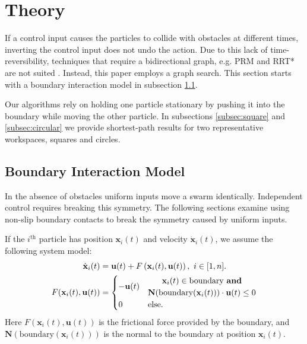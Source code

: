 \section{Theory}
\label{sec:theory}
If a control input causes the particles to collide with obstacles at different times, inverting the control input does not undo the action. Due to this lack of time-reversibility, techniques that require a bidirectional graph, e.g. PRM and RRT* are not suited \cite{lavalle2006planning,kavraki1996probabilistic}. Instead, this paper employs a graph search. This section starts with a boundary interaction model in subsection \ref{subsec:WallFriction}.

Our algorithms rely on holding one particle stationary by pushing it into the boundary while moving the other particle. In subsections \ref{subsec:square} and \ref{subsec:circular} we provide shortest-path results for two representative workspaces, squares and circles.
\subsection{Boundary Interaction Model}\label{subsec:WallFriction}

In the absence of obstacles uniform inputs move a swarm identically.  
Independent control requires breaking this symmetry. 
The following sections examine using non-slip boundary contacts to break the symmetry caused by uniform inputs.  
 
 If the $i^{\textrm{th}}$ particle has position $\mathbf{x}_i(t)$ and velocity $\dot{\mathbf{x}}_i(t)$,  we assume the following system model:
 \begin{align}\label{eq:swarmDynamicsAndFric} 
\dot{\mathbf{x}}_i(t)
 &=
 \mathbf{u}(t)
 +F \left( \mathbf{x}_i(t), \mathbf{u}(t) \right), ~i \in [1,n].\\
 F(\mathbf{x}_i(t), \mathbf{u}(t)) &= \begin{cases}
  - \mathbf{u}(t) &\begin{matrix} \mathbf{x}_i(t) \in  \textrm{boundary \textbf{and}}\\
\mathbf{N}(\textrm{boundary$(\mathbf{x}_i(t))$})\cdot   \mathbf{u}(t) \le 0 \end{matrix}
 \\
 0 & \textrm{else}.
 \end{cases}\nonumber
 \end{align}
 Here  $F(\mathbf{x}_i(t), \mathbf{u}(t)) $ is the frictional force provided by the boundary, and
 $\mathbf{N}(\textrm{boundary$(\mathbf{x}_i(t))$})$ is the normal to the boundary at position $\mathbf{x}_i(t)$.
 
